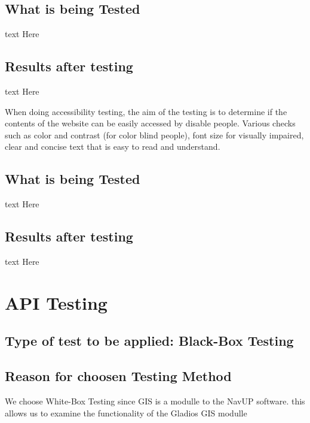 \documentclass[12pt]{article}
\begin{document}
		\subsection{What is being Tested}
		text Here
		\subsection{Results after testing}
		text Here
		
		When doing accessibility testing, the aim of the testing is to determine if the contents of the website can be easily 			accessed by disable people. Various checks such as color and contrast (for color blind people), font size for visually 			impaired, clear and concise text that is easy to read and understand.
		
		\subsection{What is being Tested}
		text Here
		\subsection{Results after testing}
		text Here
	
	

\section{API Testing}
	\subsection{Type of test to be applied: Black-Box Testing}
		\subsection{Reason for choosen Testing Method }
		We choose White-Box Testing since GIS is a modulle to the NavUP software. this allows us to examine the functionality of 
		the Gladios GIS modulle
	 
\end{document}
